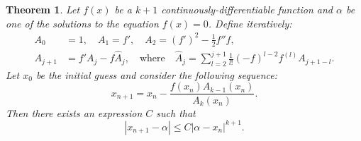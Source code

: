 \documentclass{article}
\newtheorem{theorem}{Theorem}%
\begin{document}
\begin{theorem}\label{maintheorem}
	Let $f(x)$ be a $k+1$ continuously-differentiable function and $\alpha$ be one of the solutions to the equation $f(x)=0$. Define iteratively:
	\begin{equation}\label{mtAk}
		\begin{aligned}
			A_{0} &= 1,\quad A_{1}=f',\quad A_{2}=(f')^{2}-\frac{1}{2}f''f,\\
			A_{j+1} &= f'A_{j}-f\widehat{A}_{j},\quad \text{where}\quad  \widehat{A}_{j} = \sum_{l=2}^{j+1}\frac{1}{l!}(-f)^{l-2}f^{(l)}A_{j+1-l}.
		\end{aligned}
	\end{equation} 
	Let $x_{0}$ be the initial guess and consider the following sequence:
	\[
	x_{n+1} = x_{n} - \frac{f(x_{n})A_{k-1}(x_{n})}{A_{k}(x_{n})}.
	\]
	Then there exists an expression $C$ such that 
	\[
	\left|x_{n+1}-\alpha\right|\leq C\left|\alpha-x_{n}\right|^{k+1}.
	\]
	\end{theorem}
\end{document}
